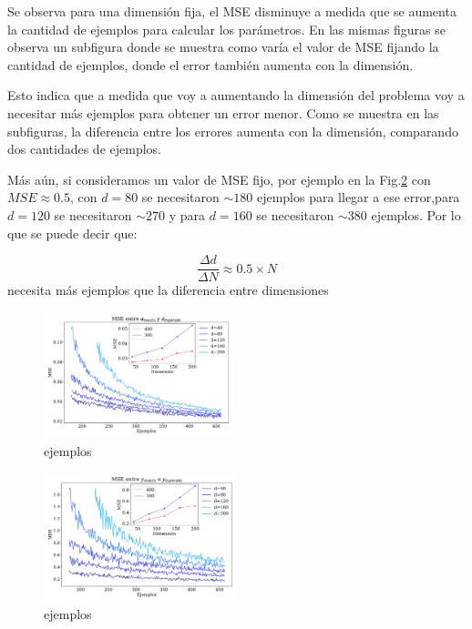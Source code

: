 Se observa  para una dimensión fija, el MSE disminuye a medida que se aumenta la cantidad de ejemplos para calcular los parámetros. En las mismas figuras se observa un subfigura donde se muestra como varía el valor de MSE fijando la cantidad de ejemplos, donde el error también aumenta con la dimensión.

Esto indica que a medida que voy a aumentando la dimensión del problema voy a necesitar más ejemplos para obtener un error menor. Como se muestra en las subfiguras,  la diferencia entre los errores  aumenta con la dimensión, comparando dos cantidades de ejemplos.

Más aún, si consideramos un valor de MSE fijo, por ejemplo en la Fig.\ref{fig:ejer1_y_ejemplos} con $MSE\approx 0.5$, con $d=80$ se necesitaron $\sim 180$ ejemplos para llegar a ese error,para  $d=120$ se necesitaron $\sim 270$ y para $d=160$ se necesitaron $\sim 380$  ejemplos. Por lo que se puede decir que:

\begin{equation}
    \frac{\Delta d}{\Delta N} \approx   0.5 \times N
\end{equation}
 necesita más ejemplos que la diferencia entre dimensiones



    \begin{figure}[H]
        \centering
        \includegraphics[width=0.49\textwidth]{plots/ejer_1_mse_a_ejemplos.pdf}
        \caption{ejemplos}
        \label{fig:ejer1_a_ejemplos}
    \end{figure}


    \begin{figure}[H]
        \centering
        \includegraphics[width=0.5\textwidth]{plots/ejer_1_mse_y_ejemplos.pdf}
        \caption{ejemplos}
        \label{fig:ejer1_y_ejemplos}
    \end{figure}

